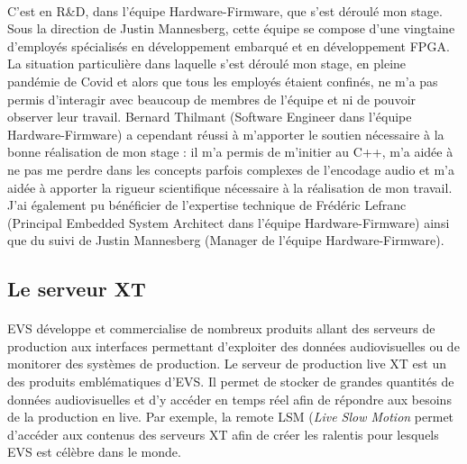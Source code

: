 \documentclass{article}
\begin{document}
    \paragraph{}
    C'est en R\&D, dans l'équipe Hardware-Firmware, que s'est déroulé mon stage. Sous la direction de Justin Mannesberg, cette équipe se compose d'une vingtaine d'employés spécialisés en développement embarqué et en développement FPGA. La situation particulière dans laquelle s'est déroulé mon stage, en pleine pandémie de Covid et alors que tous les employés étaient confinés, ne m'a pas permis d'interagir avec beaucoup de membres de l'équipe et ni de pouvoir observer leur travail. Bernard Thilmant (Software Engineer dans l'équipe Hardware-Firmware) a cependant réussi à m'apporter le soutien nécessaire à la bonne réalisation de mon stage : il m'a permis de m'initier au C++, m'a aidée à ne pas me perdre dans les concepts parfois complexes de l'encodage audio et m'a aidée à apporter la rigueur scientifique nécessaire à la réalisation de mon travail. J'ai également pu bénéficier de l'expertise technique de Frédéric Lefranc (Principal Embedded System Architect dans l'équipe Hardware-Firmware) ainsi que du suivi de Justin Mannesberg (Manager de l'équipe Hardware-Firmware).

    \subsection{Le serveur XT}
    \paragraph{}
    EVS développe et commercialise de nombreux produits allant des serveurs de production aux interfaces permettant d'exploiter des données audiovisuelles ou de monitorer des systèmes de production\cite{EVS:products}. Le serveur de production live XT est un des produits emblématiques d'EVS. Il permet de stocker de grandes quantités de données audiovisuelles et d'y accéder en temps réel afin de répondre aux besoins de la production en live. Par exemple, la remote LSM (\emph{Live Slow Motion} permet d'accéder aux contenus des serveurs XT afin de créer les ralentis pour lesquels EVS est célèbre dans le monde.
\end{document}
